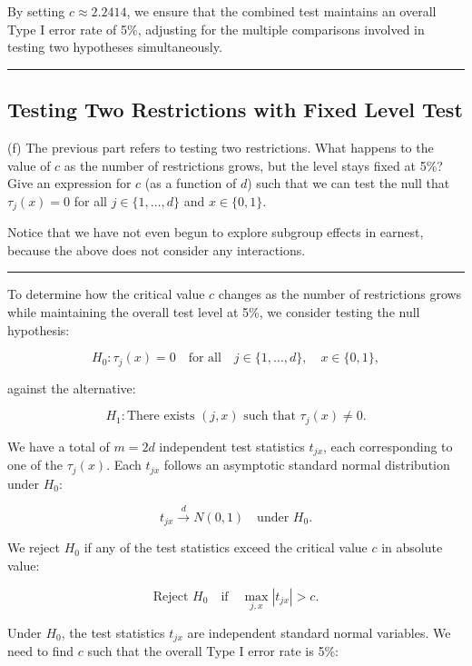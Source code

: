 \documentclass{article}
\newenvironment{colorparagraph}[1]{\par\color{#1}}{\par}
\begin{document}
By setting \( c \approx 2.2414 \), we ensure that the combined test maintains an overall Type I error rate of 5\%, adjusting for the multiple comparisons involved in testing two hypotheses simultaneously.

\begin{colorparagraph}{questioncolor}
\rule{\textwidth}{0.5pt}

\label{q1f}\subsection{Testing Two Restrictions with Fixed Level Test}
(f) The previous part refers to testing two restrictions. What happens to the value of \( c \) as the number of restrictions grows, but the level stays fixed at 5\%? Give an expression for \( c \) (as a function of \( d \)) such that we can test the null that \( \tau_j(x) = 0 \) for all \( j \in \{1, \dots, d\} \) and \( x \in \{0,1\} \).

Notice that we have not even begun to explore subgroup effects in earnest, because the above does not consider any interactions.

\rule{\textwidth}{0.5pt}
\end{colorparagraph}

To determine how the critical value \( c \) changes as the number of restrictions grows while maintaining the overall test level at 5\%, we consider testing the null hypothesis:

\[
H_0 : \tau_j(x) = 0 \quad \text{for all} \quad j \in \{1, \dots, d\}, \quad x \in \{0,1\},
\]

against the alternative:

\[
H_1 : \text{There exists } (j, x) \text{ such that } \tau_j(x) \neq 0.
\]

We have a total of \( m = 2d \) independent test statistics \( t_{jx} \), each corresponding to one of the \( \tau_j(x) \). Each \( t_{jx} \) follows an asymptotic standard normal distribution under \( H_0 \):

\[
t_{jx} \xrightarrow{d} N(0,1) \quad \text{under } H_0.
\]

We reject \( H_0 \) if any of the test statistics exceed the critical value \( c \) in absolute value:

\[
\text{Reject } H_0 \quad \text{if} \quad \max_{j,x} |t_{jx}| > c.
\]

Under \( H_0 \), the test statistics \( t_{jx} \) are independent standard normal variables. We need to find \( c \) such that the overall Type I error rate is 5\%:
\end{document}
